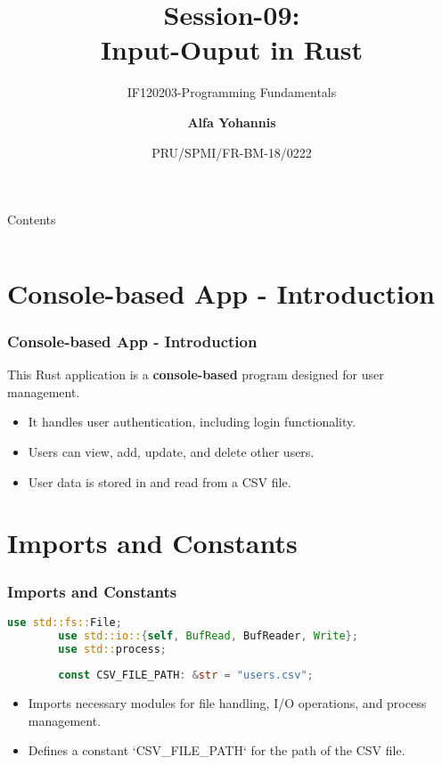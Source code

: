 \documentclass[aspectratio=169, table]{beamer}
\subtitle{IF120203-Programming Fundamentals}
\title{Session-09:\\\LARGE{Input-Ouput in Rust}\\ \vspace{10pt}}
\date[Serial]{\scriptsize {PRU/SPMI/FR-BM-18/0222}}
\author[Pradita]{\small{\textbf{Alfa Yohannis}}}
\begin{document}
\frame{\titlepage}

\begin{frame}{Contents}
	\vspace{15pt}
	\begin{columns}[t]
		\begin{column}{.5\textwidth}
			\tableofcontents[sections={1-12}]
		\end{column}
		\begin{column}{.5\textwidth}
			\tableofcontents[sections={13-24}]
		\end{column}
	\end{columns}
\end{frame}

\section{Console-based App - Introduction}
\begin{frame}
	\frametitle{Console-based App - Introduction}
	\vspace{15pt}
	This Rust application is a \textbf{console-based} program designed for user management.
	\begin{itemize}
		\item It handles user authentication, including login functionality.
		\item Users can view, add, update, and delete other users.
		\item User data is stored in and read from a CSV file.
	\end{itemize}
\end{frame}

\section{Imports and Constants}
\begin{frame}[fragile]
	\frametitle{Imports and Constants}
	\begin{lstlisting}[language=Rust]
		use std::fs::File;
		use std::io::{self, BufRead, BufReader, Write};
		use std::process;
		
		const CSV_FILE_PATH: &str = "users.csv";
	\end{lstlisting}
	\begin{itemize}
		\item Imports necessary modules for file handling, I/O operations, and process management.
		\item Defines a constant `CSV\_FILE\_PATH` for the path of the CSV file.
	\end{itemize}
\end{frame}
\end{document}
